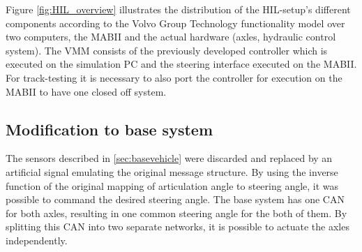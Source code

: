 \documentclass[root.tex]{subfiles}
\begin{document}
 Figure \ref{fig:HIL_overview} illustrates the distribution of the \gls{HIL}-setup's different components according to the Volvo Group Technology functionality model\cite{nilsson2015traffic} over two computers, the \gls{MABII} and the actual hardware (axles, hydraulic control system). The \gls{VMM} consists of the previously developed controller which is executed on the simulation PC and the steering interface executed on the \gls{MABII}. For track-testing it is necessary to also port the controller for execution on the \gls{MABII} to have one closed off system. %




\subsection{Modification to base system}
The sensors described in \ref{sec:basevehicle} were discarded and replaced by an artificial signal emulating the original message structure. By using the inverse  function of the original mapping of articulation angle to steering angle, it was possible to command the desired steering angle. The base system has one \gls{CAN} for both axles, resulting in one common steering angle for the both of them. By splitting this \gls{CAN} into two separate networks, it is possible to actuate the axles independently. 
\end{document}
